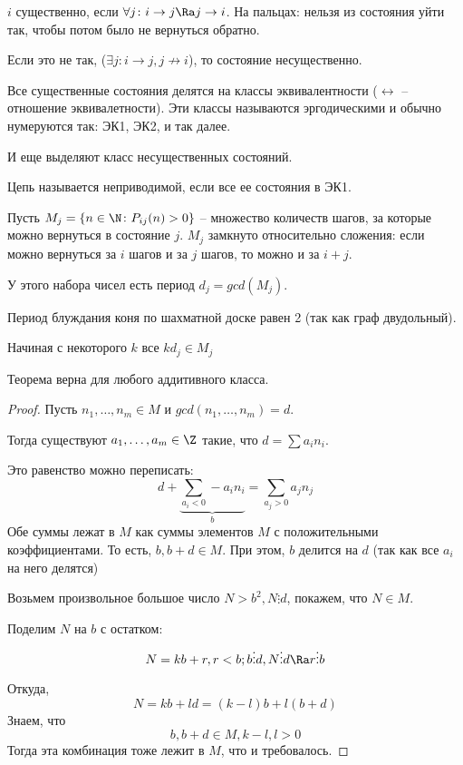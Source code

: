 \begin{Def}
$i$ существенно, если $\forall j \colon i \to j \Ra j \to i$. На пальцах: нельзя из состояния уйти так, чтобы потом было не вернуться обратно.

Если это не так, ($\exists j \colon i \to j, j \not\to i$), то состояние несущественно.
\end{Def}

Все существенные состояния делятся на классы эквивалентности ($\leftrightarrow$ -- отношение эквивалетности). 
Эти классы называются эргодическими и обычно нумеруются так: ЭК1, ЭК2, и так далее.

И еще выделяют класс несущественных состояний.

\begin{Def}
Цепь называется неприводимой, если все ее состояния в ЭК1.
\end{Def}

\begin{Def}
Пусть $M_j = \{n \in \N \colon P_{ij}(n) > 0 \}$ -- множество количеств шагов, за которые можно вернуться в состояние $j$.
$M_j$ замкнуто относительно сложения: если можно вернуться за $i$ шагов и за $j$ шагов, то можно и за $i + j$.

У этого набора чисел есть период $d_j = gcd(M_j)$. 
\end{Def}

\begin{exmp}
Период блуждания коня по шахматной доске равен 2 (так как граф двудольный).
\end{exmp}

\begin{theorem}
Начиная с некоторого $k$ все $k d_j \in M_j$
\end{theorem}
\begin{Rem}
Теорема верна для любого аддитивного класса.
\end{Rem}
\begin{proof}
Пусть $n_1, \dots, n_m \in M$ и $gcd(n_1, \dots, n_m) = d$.

Тогда существуют $a_1, \dots, a_m \in \Z$ такие, что $d = \sum a_i n_i$.

Это равенство можно переписать: $$d + \underbrace{\sum\limits_{a_i < 0} -a_i n_i}_{b} = \sum\limits_{a_j > 0} a_j n_j$$ 
Обе суммы лежат в $M$ как суммы элементов $M$ с положительными коэффициентами. То есть, $b, b + d \in M$. 
При этом, $b$ делится на $d$ (так как все $a_i$ на него делятся)

Возьмем произвольное большое число $N > b^2, N \vdots d$, покажем, что $N \in M$.

Поделим $N$ на $b$ с остатком: $$N = kb + r, r < b; b \vdots d, N \vdots d \Ra r \vdots b$$

Откуда, $$N = kb + ld = (k - l) b + l (b + d)$$ 
Знаем, что $$b, b + d \in M, k - l, l > 0$$ 
Тогда эта комбинация тоже лежит в $M$, что и требовалось.
\end{proof}

